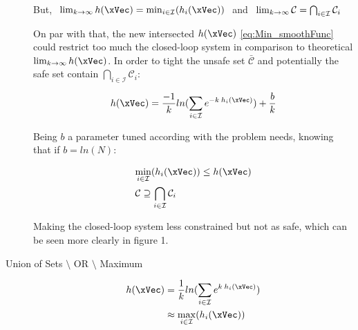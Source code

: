 \begin{description}
    But, \(\hspace{0.4em} \lim_{k \to \infty} h(\xVec) = {\min}_{i \in \mathcal{I}} (h_i(\xVec)) \hspace{0.4em}\) and \( \hspace{0.4em} \lim_{k \to \infty} \mathcal{C} = \bigcap_{i \in \mathcal{I}} \mathcal{C}_i\) \par

    On par with that, the new intersected  \(h(\xVec)\) \ref{eq:Min_smoothFunc} could restrict too much the closed-loop system in comparison to theoretical  \( \lim_{k \to \infty} h(\xVec)\). In order to tight the unsafe set \(\bar{\mathcal{C}}\) and potentially the safe set contain \( \bigcap_{i \in \mathcal{I}} \mathcal{C}_i\): 
    
    \begin{equation}
        h(\xVec) = \frac{-1}{k}ln(\sum_{i \in \mathcal{I}} e^{-k \hspace{0.2em} h_i(\xVec)}) + \frac{b}{k}
        \label{eq:Min_smoothFunc_tighted} \\  
    \end{equation}



    Being \(b\) a parameter tuned according with the problem needs, knowing that if \(b = ln (N)\):

    \begin{subequations}
        \begin{align}
            &\underset{i \in \mathcal{I}}{\min} (h_i(\xVec)) \leq h(\xVec) %
            \label{eq:Intersection_CBF_Comparation_tighted} \\
            &\mathcal{C} \supseteq \bigcap_{i \in \mathcal{I}} \mathcal{C}_i
            \label{eq:Intersection_SafeSet_Comparation_tighted}
        \end{align}
    \end{subequations}

    Making the closed-loop system less constrained but not as safe, which can be seen more clearly in \cite{molnar2023composing} figure 1.

    \item[Union of Sets \(\setminus\) OR \(\setminus\) Maximum]

    \begin{align}
        h(\xVec) &= \frac{1}{k}ln(\sum_{i \in \mathcal{I}} e^{k \hspace{0.2em} h_i(\xVec)}) 
        \label{eq:Max_smoothFunc} \\
                 &\approx \underset{i \in \mathcal{I}}{\max} (h_i(\xVec))
        \notag  
    \end{align}


\end{description}
